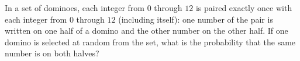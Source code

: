 In a set of dominoes, each integer from $0$ through $12$ is paired exactly once with each integer from $0$ through $12$ (including itself): one number of the pair is written on one half of a domino and the other number on the other half. If one domino is selected at random from the set, what is the probability that the same number is on both halves?
